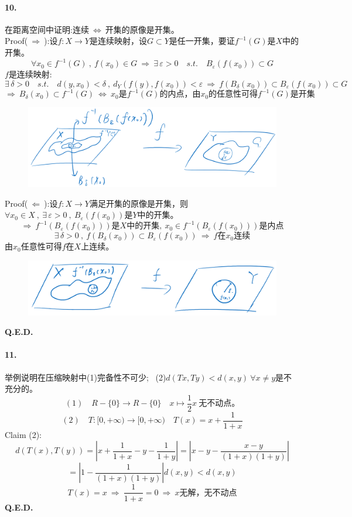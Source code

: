 \paragraph*{10.}在距离空间中证明:连续$\ \Leftrightarrow \ $开集的原像是开集。\\
Proof($\ \Rightarrow \ $):设$f:X \to Y$是连续映射，设$G \subset Y$是任一开集，要证$f^{-1}(G)$是$X$中的开集。
\[\forall x_0 \in f^{-1}(G) \ , \ f(x_0) \in G \ \Rightarrow \ \exists \, \varepsilon>0 \quad s.t. \quad B_{\varepsilon}(f(x_0)) \subset G\]
$f$是连续映射:
\[\exists \, \delta>0 \quad s.t. \quad d(y,x_0)<\delta \ , \ d_Y(f(y),f(x_0))<\varepsilon \ \Rightarrow \ f(B_{\delta}(x_0)) \subset B_{\varepsilon}(f(x_0)) \subset G\]
\[\Rightarrow \ B_{\delta}(x_0) \subset f^{-1}(G) \ \Leftrightarrow \ x_0\text{是}f^{-1}(G)\text{的内点，由}x_0\text{的任意性可得}f^{-1}(G)\text{是开集}\]
\begin{figure}[htbp]
    \center
    \includegraphics[scale=0.2]{./fig/ex-2.png}
\end{figure}
Proof($\ \Leftarrow \ $):设$f:X \to Y$满足开集的原像是开集，则$\forall x_0 \in X \ , \ \exists \, \varepsilon>0 \ , \ B_{\varepsilon}(f(x_0))$是$Y$中的开集。
\[\Rightarrow \ f^{-1}(B_{\varepsilon}(f(x_0)))\text{是$X$中的开集}, \ x_0 \in f^{-1}(B_{\varepsilon}(f(x_0)))\text{是内点}\]
\[\exists \, \delta>0 \ , \ f(B_{\delta}(x_0)) \subset B_{\varepsilon}(f(x_0)) \ \Rightarrow \ f\text{在}x_0\text{连续}\]
由$x_0$任意性可得$f$在$X$上连续。
\begin{figure}[htbp]
    \center
    \includegraphics[scale=0.2]{./fig/ex-3.png}
\end{figure}
\textbf{Q.E.D.}

\paragraph*{11.}举例说明在压缩映射中(1)完备性不可少; \ (2)$d(Tx,Ty)<d(x,y) \ \forall x \neq y$是不充分的。
\[(1) \quad R-\{0\} \to R-\{0\} \quad x \mapsto \frac{1}{2}x \ \text{无不动点。}\]
\[(2) \quad T:[0,+\infty) \to [0,+\infty) \quad T(x)=x+\frac{1}{1+x}\]
Claim (2):
\[d(T(x),T(y))=\left|x+\frac{1}{1+x}-y-\frac{1}{1+y}\right|=\left|x-y-\frac{x-y}{(1+x)(1+y)}\right|\]
\[=\left|1-\frac{1}{(1+x)(1+y)}\right|d(x,y)<d(x,y)\]
\[T(x)=x \ \Rightarrow \ \frac{1}{1+x}=0 \ \Rightarrow \ x\text{无解，无不动点}\]
\textbf{Q.E.D.}

